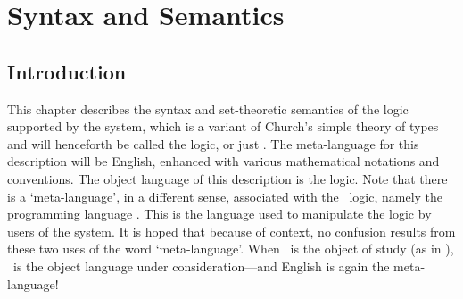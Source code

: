 \chapter{Syntax and Semantics}\label{logic}

\section{Introduction}
\label{introduction}

This chapter describes the syntax and set-theoretic semantics of the
logic supported by the \HOL{} system, which is a variant of
Church's simple theory of types \cite{Church} and
will henceforth be called the \HOL{} logic, or just \HOL.  The
meta-language for this description will be English, enhanced with
various mathematical notations and conventions.  The object language
of this description is the \HOL{} logic.  Note that there is a
`meta-language', in a different sense, associated with the \HOL\
logic, namely the programming language \ML.  This is the language used
to manipulate the \HOL{} logic by users of the system.  It is hoped
that because of context, no confusion results from these two uses of
the word `meta-language'.  When \ML\ is the object of study (as in
\cite{sml}), \ML\ is the object language under consideration---and
English is again the meta-language!

